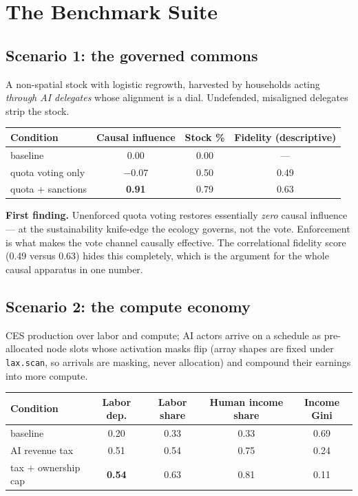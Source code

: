 \documentclass[11pt]{article}
\begin{document}
\section{The Benchmark Suite}

\subsection{Scenario 1: the governed commons}

A non-spatial stock with logistic regrowth, harvested by households acting \emph{through AI
delegates} whose alignment is a dial. Undefended, misaligned delegates strip the stock.

\begin{center}
\begin{tabular}{@{}lccc@{}}
\toprule
\textbf{Condition} & \textbf{Causal influence} & \textbf{Stock \%} & \textbf{Fidelity (descriptive)} \\
\midrule
baseline              & 0.00  & 0.00 & --- \\
quota voting only     & $-0.07$ & 0.50 & 0.49 \\
quota $+$ sanctions   & \textbf{0.91}  & 0.79 & 0.63 \\
\bottomrule
\end{tabular}
\end{center}

\noindent \textbf{First finding.} Unenforced quota voting restores essentially \emph{zero}
causal influence --- at the sustainability knife-edge the ecology governs, not the vote.
Enforcement is what makes the vote channel causally effective. The correlational fidelity
score (0.49 versus 0.63) hides this completely, which is the argument for the whole causal
apparatus in one number.

\subsection{Scenario 2: the compute economy}

CES production over labor and compute; AI actors arrive on a schedule as pre-allocated
node slots whose activation masks flip (array shapes are fixed under \texttt{lax.scan}, so
arrivals are masking, never allocation) and compound their earnings into more compute.

\begin{center}
\begin{tabular}{@{}lcccc@{}}
\toprule
\textbf{Condition} & \textbf{Labor dep.} & \textbf{Labor share} & \textbf{Human income share} & \textbf{Income Gini} \\
\midrule
baseline              & 0.20 & 0.33 & 0.33 & 0.69 \\
AI revenue tax        & 0.51 & 0.54 & 0.75 & 0.24 \\
tax $+$ ownership cap & \textbf{0.54} & 0.63 & 0.81 & 0.11 \\
\bottomrule
\end{tabular}
\end{center}
\end{document}
